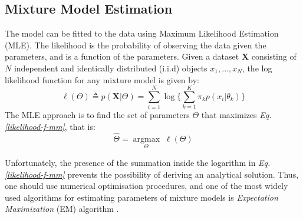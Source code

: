\subsection{Mixture Model Estimation} \label{mixt-model-estimation-l-subsect}
The model can be fitted to the data using Maximum Likelihood Estimation (MLE). The likelihood is the probability of observing the data given the parameters, and is a function of the parameters. Given a dataset $\mathbf{X}$ consisting of $N$ independent and identically distributed (i.i.d) objects $x_{1}, ..., x_{N}$, the log likelihood function for any mixture model is given by:
\begin{equation} \label{likelihood-f-mm}
	\ell(\Theta) \triangleq p(\mathbf{X}|\Theta) = \sum_{i=1}^{N} \log \bigg\lbrace \sum_{k=1}^{K}\pi_{k}p(x_{i}|\theta_{k})\bigg\rbrace
\end{equation}
The MLE approach is to find the set of parameters $\Theta$ that maximizes \emph{Eq. \ref{likelihood-f-mm}}, that is:
\begin{equation} \label{MLE-f-mm}
	\hat{\Theta} =  \underset{\Theta}{\operatorname{argmax}} \; \ell(\Theta)
\end{equation}

Unfortunately, the presence of the summation inside the logarithm in \emph{Eq. \ref{likelihood-f-mm}} prevents the possibility of deriving an analytical solution. Thus, one should use numerical optimisation procedures, and one of the most widely used algorithms for estimating parameters of mixture models is \emph{Expectation Maximization} (EM) algorithm \citep{Dempster1977}. 